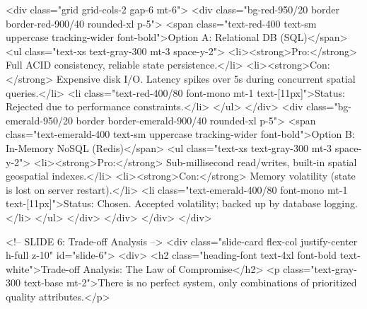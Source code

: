                     <div class="grid grid-cols-2 gap-6 mt-6">
                        <div class="bg-red-950/20 border border-red-900/40 rounded-xl p-5">
                            <span class="text-red-400 text-sm uppercase tracking-wider font-bold">Option A: Relational DB (SQL)</span>
                            <ul class="text-xs text-gray-300 mt-3 space-y-2">
                                <li><strong>Pro:</strong> Full ACID consistency, reliable state persistence.</li>
                                <li><strong>Con:</strong> Expensive disk I/O. Latency spikes over 5s during concurrent spatial queries.</li>
                                <li class="text-red-400/80 font-mono mt-1 text-[11px]">Status: Rejected due to performance constraints.</li>
                            </ul>
                        </div>
                        <div class="bg-emerald-950/20 border border-emerald-900/40 rounded-xl p-5">
                            <span class="text-emerald-400 text-sm uppercase tracking-wider font-bold">Option B: In-Memory NoSQL (Redis)</span>
                            <ul class="text-xs text-gray-300 mt-3 space-y-2">
                                <li><strong>Pro:</strong> Sub-millisecond read/writes, built-in spatial geospatial indexes.</li>
                                <li><strong>Con:</strong> Memory volatility (state is lost on server restart).</li>
                                <li class="text-emerald-400/80 font-mono mt-1 text-[11px]">Status: Chosen. Accepted volatility; backed up by database logging.</li>
                            </ul>
                        </div>
                    </div>
                </div>
            </div>

            <!-- SLIDE 6: Trade-off Analysis -->
            <div class="slide-card flex-col justify-center h-full z-10" id="slide-6">
                <div>
                    <h2 class="heading-font text-4xl font-bold text-white">Trade-off Analysis: The Law of Compromise</h2>
                    <p class="text-gray-300 text-base mt-2">There is no perfect system, only combinations of prioritized quality attributes.</p>
                    
